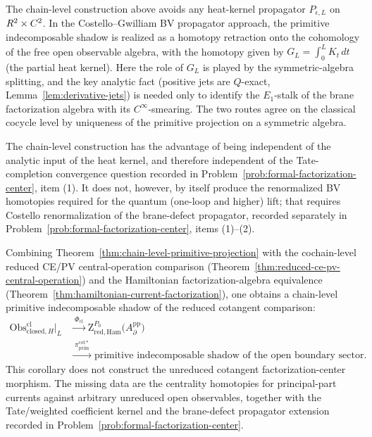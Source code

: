 \begin{rmk}
  \label{rmk:no-heat-kernel-needed}
  The chain-level construction above avoids any heat-kernel
  propagator $P_{\epsilon,L}$ on $R^2\times C^2$.  In the
  Costello--Gwilliam BV propagator approach, the primitive
  indecomposable shadow is realized as a homotopy retraction onto the cohomology
  of the free open observable algebra, with the homotopy given by
  $G_L=\int_0^L K_t\,dt$ (the partial heat kernel).  Here the role of
  $G_L$ is played by the symmetric-algebra splitting, and the key
  analytic fact (positive jets are $Q$-exact,
  Lemma~\ref{lem:derivative-jets}) is needed only to
  identify the $E_1$-stalk of the brane factorization algebra with its
  $C^\infty$-smearing.  The two routes agree on the classical
  cocycle level by uniqueness of the primitive projection on a symmetric
  algebra.

  The chain-level construction has the advantage of being independent
  of the analytic input of the heat kernel, and therefore independent
  of the Tate-completion convergence question recorded in
  Problem~\ref{prob:formal-factorization-center}, item (1).  It does
  not, however, by itself produce the renormalized BV homotopies
  required for the quantum (one-loop and higher) lift; that requires
  Costello renormalization of the brane-defect propagator, recorded
  separately in
  Problem~\ref{prob:formal-factorization-center}, items (1)--(2).
\end{rmk}

\begin{cor}
  \label{cor:unreduced-d-closed}
  Combining
  Theorem~\ref{thm:chain-level-primitive-projection} with the
  cochain-level reduced CE/PV central-operation comparison
  (Theorem~\ref{thm:reduced-ce-pv-central-operation}) and the Hamiltonian
  factorization-algebra equivalence
  (Theorem~\ref{thm:hamiltonian-current-factorization}), one
	  obtains a chain-level primitive indecomposable shadow of the reduced cotangent
  comparison:
  \begin{align*}
    \mathrm{Obs}^{\mathrm{cl}}_{\mathrm{closed},H}\big|_{L}
    &\xrightarrow{\;\Phi_{\mathrm{cl}}\;}
    \mathrm Z^{P_0}_{\mathrm{red,Ham}}\bigl(A_\partial^{\mathrm{pp}}\bigr) \\
    &\xrightarrow{\;\pi_{\mathrm{prim}}^{\mathrm{cot}*}\;}
    \text{primitive indecomposable shadow of the open boundary sector}.
  \end{align*}
  This corollary does not construct the unreduced cotangent
  factorization-center morphism. The missing data are the centrality
  homotopies for principal-part currents against arbitrary unreduced
  open observables, together with the Tate/weighted coefficient kernel
  and the brane-defect propagator extension recorded in
  Problem~\ref{prob:formal-factorization-center}.
\end{cor}

